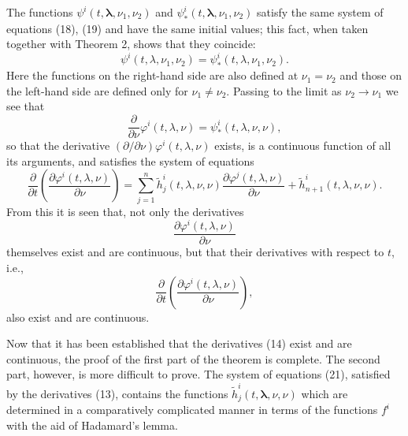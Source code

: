 \documentclass[10pt,a5paper]{book}
\makeatletter
\theoremstyle{plain}
\theoremstyle{definition}
\theoremstyle{remark}
\renewenvironment{proof}[1][\proofname]{\par
  \pushQED{\qed}%
  \normalfont\topsep6\p@\@plus6\p@\relax
  \trivlist
  \item\relax{\itshape #1\@addpunct{.}}\hspace\labelsep\ignorespaces
}{\popQED\endtrivlist\@endpefalse}
\makeatother
\begin{document}
\begin{proof}
The functions $\psi^{i}\left(t, \boldsymbol{\lambda}, \nu_{1}, \nu_{2}\right)$ and $\psi_{*}^{i}\left(t, \boldsymbol{\lambda}, \nu_{1}, \nu_{2}\right)$ satisfy the same system of equations (18), (19) and have the same initial values; this fact, when taken together with Theorem 2, shows that they coincide:
\[
\psi^{i}\left(t, \lambda, \nu_{1}, \nu_{2}\right)=\psi_{*}^{i}\left(t, \lambda, \nu_{1}, \nu_{2}\right) .
\]
Here the functions on the right-hand side are also defined at $\nu_{1}=\nu_{2}$ and those on the left-hand side are defined only for $\nu_{1} \neq \nu_{2}$. Passing to the limit as $\nu_{2} \rightarrow \nu_{1}$ we see that
\[
\frac{\partial}{\partial \nu} \varphi^{i}(t, \lambda, \nu)=\psi_{*}^{i}(t, \lambda, \nu, \nu),
\]
so that the derivative $(\partial / \partial \nu) \varphi^{i}(t, \lambda, \nu)$ exists, is a continuous function of all its arguments, and satisfies the system of equations
\begin{equation*}
\frac{\partial}{\partial t}\left(\frac{\partial \varphi^{i}(t, \lambda, \nu)}{\partial \nu}\right)=\sum_{j=1}^{n} \tilde{h}_{j}^{i}(t, \lambda, \nu, \nu) \frac{\partial \varphi^{j}(t, \lambda, \nu)}{\partial \nu}+\tilde{h}_{n+1}^{i}(t, \lambda, \nu, \nu) . \tag{21}
\end{equation*}
From this it is seen that, not only the derivatives
\[
\frac{\partial \varphi^{i}(t, \lambda, \nu)}{\partial \nu}
\]
themselves exist and are continuous, but that their derivatives with respect to $t$, i.e.,
\begin{equation*}
\frac{\partial}{\partial t}\left(\frac{\partial \varphi^{i}(t, \lambda, \nu)}{\partial \nu}\right), \tag{22}
\end{equation*}
also exist and are continuous.

Now that it has been established that the derivatives (14) exist and are continuous, the proof of the first part of the theorem is complete. The second part, however, is more difficult to prove. The system of equations (21), satisfied by the derivatives (13), contains the functions $\tilde{h}_{j}^{i}(t, \boldsymbol{\lambda}, \nu, \nu)$ which are determined in a comparatively complicated manner in terms of the functions $f^{i}$ with the aid of Hadamard's lemma.


\end{proof}
\end{document}
